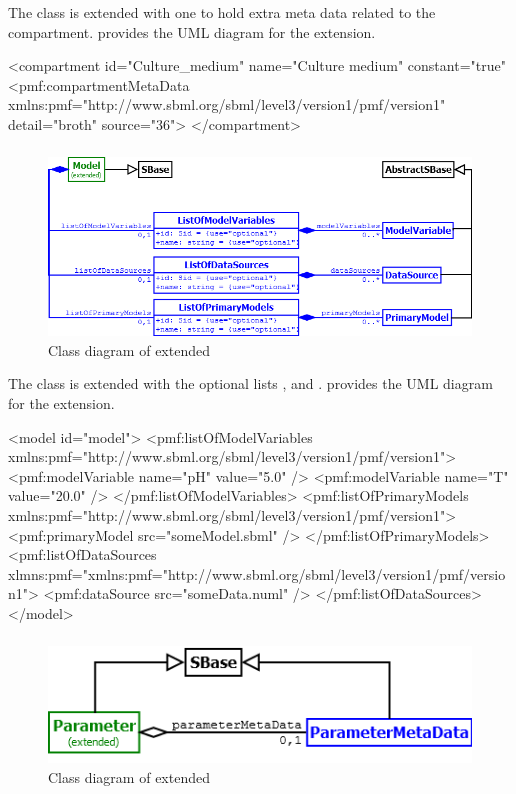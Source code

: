The \Compartment class is extended with one \CompartmentMetaData to hold extra
meta data related to the compartment.  provides the UML
diagram for the extension.

\begin{example}
<compartment id="Culture_medium" name="Culture medium" constant="true"
  <pmf:compartmentMetaData xmlns:pmf="http://www.sbml.org/sbml/level3/version1/pmf/version1"
    detail="broth" source="36">
</compartment>
\end{example}

\subsubsection{}
\begin{figure}[h]
	\includegraphics[scale=0.6]{img/Model}
	\caption{Class diagram of extended \Model}
	\label{Model}
\end{figure}

The \Model class is extended with the optional lists \ListOfPrimaryModels,
\ListOfDataSources and \ListOfPrimaryModels.  provides the UML
diagram for the extension.

\begin{example}
<model id="model">
  <pmf:listOfModelVariables xmlns:pmf="http://www.sbml.org/sbml/level3/version1/pmf/version1">
    <pmf:modelVariable name="pH" value="5.0" />
    <pmf:modelVariable name="T" value="20.0" />
  </pmf:listOfModelVariables>
  <pmf:listOfPrimaryModels xmlns:pmf="http://www.sbml.org/sbml/level3/version1/pmf/version1">
    <pmf:primaryModel src="someModel.sbml" />
  </pmf:listOfPrimaryModels>
  <pmf:listOfDataSources
    xlmns:pmf="xmlns:pmf="http://www.sbml.org/sbml/level3/version1/pmf/version1">
    <pmf:dataSource src="someData.numl" />
  </pmf:listOfDataSources>
</model>
\end{example}

\subsubsection{}
\begin{figure}[h]
	\includegraphics[scale=0.8]{img/Parameter}
	\caption{Class diagram of extended \Parameter}
	\label{Parameter}
\end{figure}

